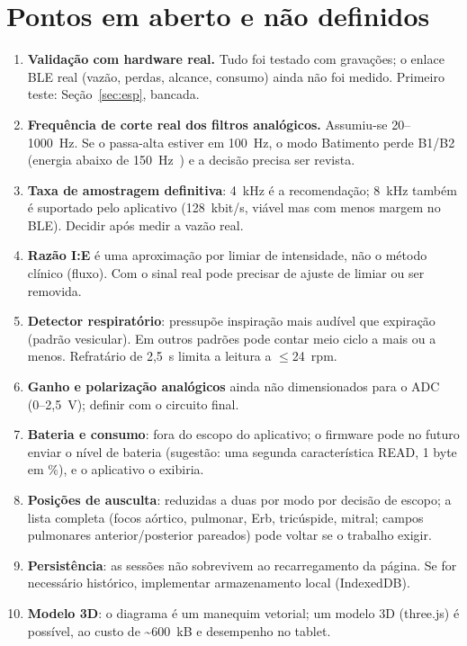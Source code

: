 \documentclass[conference,a4paper]{IEEEtran}
\begin{document}
\section{Pontos em aberto e não definidos}
\label{sec:aberto}
\begin{enumerate}[leftmargin=*]
\item \textbf{Validação com hardware real.} Tudo foi testado com gravações; o enlace BLE real (vazão, perdas, alcance, consumo) ainda não foi medido. Primeiro teste: Seção~\ref{sec:esp}, bancada.
\item \textbf{Frequência de corte real dos filtros analógicos.} Assumiu-se 20--1000~Hz. Se o passa-alta estiver em 100~Hz, o modo Batimento perde B1/B2 (energia abaixo de 150~Hz~\cite{arnott1984}) e a decisão precisa ser revista.
\item \textbf{Taxa de amostragem definitiva}: 4~kHz é a recomendação; 8~kHz também é suportado pelo aplicativo (128~kbit/s, viável mas com menos margem no BLE). Decidir após medir a vazão real.
\item \textbf{Razão I:E} é uma aproximação por limiar de intensidade, não o método clínico (fluxo). Com o sinal real pode precisar de ajuste de limiar ou ser removida.
\item \textbf{Detector respiratório}: pressupõe inspiração mais audível que expiração (padrão vesicular). Em outros padrões pode contar meio ciclo a mais ou a menos. Refratário de 2,5~s limita a leitura a $\leq$24~rpm.
\item \textbf{Ganho e polarização analógicos} ainda não dimensionados para o ADC (0--2,5~V); definir com o circuito final.
\item \textbf{Bateria e consumo}: fora do escopo do aplicativo; o firmware pode no futuro enviar o nível de bateria (sugestão: uma segunda característica READ, 1 byte em \%), e o aplicativo o exibiria.
\item \textbf{Posições de ausculta}: reduzidas a duas por modo por decisão de escopo; a lista completa (focos aórtico, pulmonar, Erb, tricúspide, mitral; campos pulmonares anterior/posterior pareados) pode voltar se o trabalho exigir.
\item \textbf{Persistência}: as sessões não sobrevivem ao recarregamento da página. Se for necessário histórico, implementar armazenamento local (IndexedDB).
\item \textbf{Modelo 3D}: o diagrama é um manequim vetorial; um modelo 3D (three.js) é possível, ao custo de \textasciitilde600~kB e desempenho no tablet.
\end{enumerate}
\end{document}
